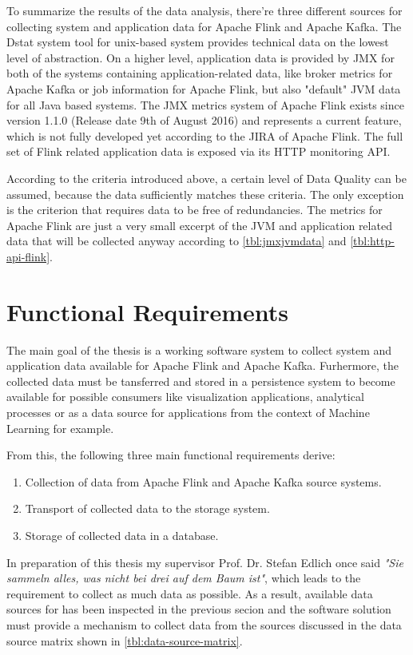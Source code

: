To summarize the results of the data analysis, there're three different sources for collecting system and application
data for Apache Flink and Apache Kafka. The Dstat system tool for unix-based system provides technical data on the
lowest level of abstraction. On a higher level, application data is provided by JMX for both of the systems containing
application-related data, like broker metrics for Apache Kafka or job information for Apache Flink, but also "default"
JVM data for all Java based systems. The JMX metrics system of Apache Flink exists since version 1.1.0 (Release date
9th of August 2016) and represents a current feature, which is not fully developed yet according to the JIRA of
Apache Flink. The full set of Flink related application data is exposed via its HTTP
monitoring API.

According to the criteria introduced above, a certain level of Data Quality can be assumed, because the data sufficiently
matches these criteria. The only exception is the criterion that requires data to be free of redundancies. The metrics
for Apache Flink are just a very small excerpt of the JVM and application related data that will be collected anyway according
to \autoref{tbl:jmxjvmdata} and \autoref{tbl:http-api-flink}.

\section{Functional Requirements}
\label{sec:fr}
The main goal of the thesis is a working software system to collect system and application data available
for Apache Flink and Apache Kafka. Furhermore, the collected data must be tansferred and stored in a
persistence system to become available for possible consumers like visualization applications,
analytical processes or as a data source for applications from the context of Machine Learning
for example.

From this, the following three main functional requirements derive:
\begin{enumerate}
    \item Collection of data from Apache Flink and Apache Kafka source systems.
    \item Transport of collected data to the storage system.
    \item Storage of collected data in a database.
\end{enumerate}

In preparation of this thesis my supervisor Prof. Dr. Stefan Edlich once said \textit{"Sie sammeln
alles, was nicht bei drei auf dem Baum ist"}, which leads to the requirement to collect as much data
as possible. As a result, available data sources for has been inspected in the previous secion and the
software solution must provide a mechanism to collect data from the sources discussed in the data source
matrix shown in \autoref{tbl:data-source-matrix}.


